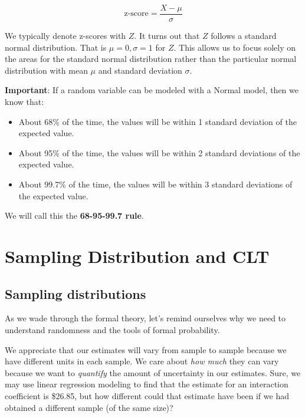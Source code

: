 \documentclass[
]{book}
\providecommand{\tightlist}{%
  \setlength{\itemsep}{0pt}\setlength{\parskip}{0pt}}
\begin{document}
\[\text{z-score} = \frac{X - \mu}{\sigma}\]

We typically denote z-scores with \(Z\). It turns out that \(Z\) follows a standard normal distribution. That is \(\mu=0, \sigma=1\) for \(Z\). This allows us to focus solely on the areas for the standard normal distribution rather than the particular normal distribution with mean \(\mu\) and standard deviation \(\sigma\).

\textbf{Important}: If a random variable can be modeled with a Normal model, then we know that:

\begin{itemize}
\tightlist
\item
  About 68\% of the time, the values will be within 1 standard deviation of the expected value.
\item
  About 95\% of the time, the values will be within 2 standard deviations of the expected value.
\item
  About 99.7\% of the time, the values will be within 3 standard deviations of the expected value.
\end{itemize}

We will call this the \textbf{68-95-99.7 rule}.

\section{Sampling Distribution and CLT}\label{sampling-distribution-and-clt}

\subsection{Sampling distributions}\label{sampling-distributions}

As we wade through the formal theory, let's remind ourselves why we need to understand randomness and the tools of formal probability.

We appreciate that our estimates will vary from sample to sample because we have different units in each sample. We care about \emph{how much} they can vary because we want to \emph{quantify} the amount of uncertainty in our estimates. Sure, we may use linear regression modeling to find that the estimate for an interaction coefficient is \$26.85, but how different could that estimate have been if we had obtained a different sample (of the same size)?
\end{document}
